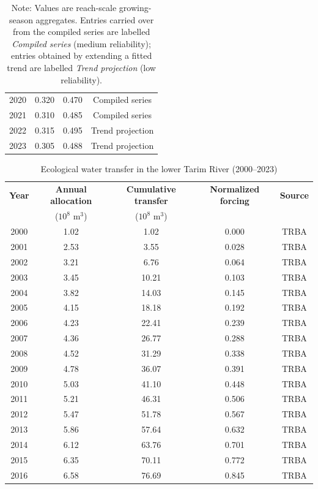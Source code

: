 \documentclass[12pt,a4paper]{article}
\begin{document}
\begin{table}[H]
\begin{tabular}{cccc}
			2020 & 0.320 & 0.470 & Compiled series \\
			2021 & 0.310 & 0.485 & Compiled series \\
			2022 & 0.315 & 0.495 & Trend projection \\
			2023 & 0.305 & 0.488 & Trend projection \\
		\bottomrule
	\end{tabular}
	\caption*{Note: Values are reach-scale growing-season aggregates. Entries carried over from the compiled series are labelled \emph{Compiled series} (medium reliability); entries obtained by extending a fitted trend are labelled \emph{Trend projection} (low reliability).}
\end{table}

\begin{table}[H]
	\centering
	\caption{Ecological water transfer in the lower Tarim River (2000--2023)}
	\label{tab:s1}
	\footnotesize
	\begin{tabular}{ccccc}
		\toprule
		\textbf{Year} & \textbf{Annual allocation} & \textbf{Cumulative transfer} & \textbf{Normalized forcing} & \textbf{Source} \\
		 & ($10^{8}$ m$^{3}$) & ($10^{8}$ m$^{3}$) & & \\
		\midrule
			2000 & 1.02 & 1.02 & 0.000 & TRBA \\
			2001 & 2.53 & 3.55 & 0.028 & TRBA \\
			2002 & 3.21 & 6.76 & 0.064 & TRBA \\
			2003 & 3.45 & 10.21 & 0.103 & TRBA \\
			2004 & 3.82 & 14.03 & 0.145 & TRBA \\
			2005 & 4.15 & 18.18 & 0.192 & TRBA \\
			2006 & 4.23 & 22.41 & 0.239 & TRBA \\
			2007 & 4.36 & 26.77 & 0.288 & TRBA \\
			2008 & 4.52 & 31.29 & 0.338 & TRBA \\
			2009 & 4.78 & 36.07 & 0.391 & TRBA \\
			2010 & 5.03 & 41.10 & 0.448 & TRBA \\
			2011 & 5.21 & 46.31 & 0.506 & TRBA \\
			2012 & 5.47 & 51.78 & 0.567 & TRBA \\
			2013 & 5.86 & 57.64 & 0.632 & TRBA \\
			2014 & 6.12 & 63.76 & 0.701 & TRBA \\
			2015 & 6.35 & 70.11 & 0.772 & TRBA \\
			2016 & 6.58 & 76.69 & 0.845 & TRBA \\

\end{tabular}
\end{table}
\end{document}
